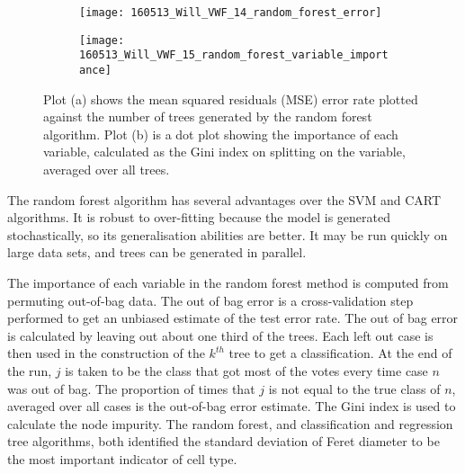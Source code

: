 \begin{figure}[htbp]\centering
	\begin{subfigure}[b]{0.70\linewidth}
		\centering
		\texttt{[image: 160513\_Will\_VWF\_14\_random\_forest\_error]}
		\caption{}
		\label{figure:endothelial_morphometry:random_forest_error_rate}
	\end{subfigure}
	\begin{subfigure}[b]{0.79\linewidth}
		\centering
		\texttt{[image: 160513\_Will\_VWF\_15\_random\_forest\_variable\_importance]}
		\caption{}
		\label{figure:endothelial_morphometry:random_forest_variable_importance}
	\end{subfigure}
	\caption[Error rate and variable importance in random forest trees]{Plot (a) shows the mean squared residuals (MSE) error rate plotted against the number of trees generated by the random forest algorithm. Plot (b) is a dot plot showing the importance of each variable, calculated as the Gini index on splitting on the variable, averaged over all trees.}
\label{figure:endothelial_morphometry:random_forest_stats}
\end{figure}

The random forest algorithm has several advantages over the SVM and CART algorithms. It is robust to over-fitting because the model is generated stochastically, so its generalisation abilities are better. It may be run quickly on large data sets, and trees can be generated in parallel.

The importance of each variable in the random forest method is computed from permuting out-of-bag data. The out of bag error is a cross-validation step performed to get an unbiased estimate of the test error rate. The out of bag error is calculated by leaving out about one third of the trees. Each left out case is then used in the construction of the $k^{th}$ tree to get a classification. At the end of the run, $j$ is taken to be the class that got most of the votes every time case $n$ was out of bag. The proportion of times that $j$ is not equal to the true class of $n$, averaged over all cases is the out-of-bag error estimate. The Gini index is used to calculate the node impurity. The random forest, and classification and regression tree algorithms, both identified the standard deviation of Feret diameter to be the most important indicator of cell type.

